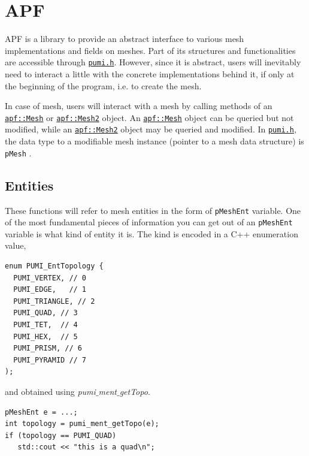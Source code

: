 \documentclass{article}
\begin{document}
\section{APF}

APF is a library to provide an abstract interface to various mesh implementations and fields on meshes. Part of its structures and functionalities are accessible through \href{https://github.com/SCOREC/core/blob/master/pumi/pumi.h}{\texttt{pumi.h}}.   
However, since it is abstract, users will inevitably need to
interact a little with the concrete implementations behind it,
if only at the beginning of the program, i.e. to create the mesh.

In case of mesh, users will interact with a mesh by calling methods of an
\href{http://scorec.rpi.edu/~dibanez/core/classapf_1_1Mesh.html}{\texttt{apf::Mesh}}
or
\href{http://scorec.rpi.edu/~dibanez/core/classapf_1_1Mesh2.html}{\texttt{apf::Mesh2}}
object.
An
\href{http://scorec.rpi.edu/~dibanez/core/classapf_1_1Mesh.html}{\texttt{apf::Mesh}}
object can be queried but not modified, while an
\href{http://scorec.rpi.edu/~dibanez/core/classapf_1_1Mesh2.html}{\texttt{apf::Mesh2}}
object may be queried and modified.
In \href{https://github.com/SCOREC/core/blob/master/pumi/pumi.h}{\texttt{pumi.h}}, the data type to a modifiable mesh instance (pointer to a mesh data structure) is \texttt{pMesh} .
\subsection{Entities}

These functions will refer to mesh entities in the
form of \texttt{pMeshEnt} variable.
One of the most fundamental pieces of information you can get
out of an \texttt{pMeshEnt} variable is what kind of
entity it is.
The kind is encoded in a C++ enumeration value,
\begin{lstlisting}
enum PUMI_EntTopology {
  PUMI_VERTEX, // 0   
  PUMI_EDGE,   // 1   
  PUMI_TRIANGLE, // 2  
  PUMI_QUAD, // 3 
  PUMI_TET,  // 4
  PUMI_HEX,  // 5 
  PUMI_PRISM, // 6
  PUMI_PYRAMID // 7
);
\end{lstlisting}

and obtained using \emph{pumi$\_$ment$\_$getTopo}.

\begin{lstlisting}
pMeshEnt e = ...;
int topology = pumi_ment_getTopo(e);
if (topology == PUMI_QUAD)
   std::cout << "this is a quad\n";
\end{lstlisting}
\end{document}
